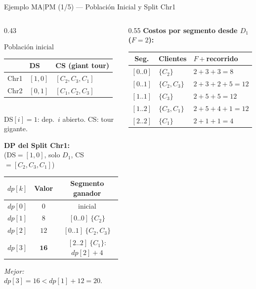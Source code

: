 \documentclass[aspectratio=169,10pt]{beamer}
\begin{document}
\begin{frame}{Ejemplo MA$|$PM (1/5) --- Población Inicial y Split Chr1}
  \begin{columns}[T,onlytextwidth]
    \begin{column}{0.43\textwidth}
      \begin{block}{Población inicial}\footnotesize
        \begin{tabular}{lll}
          \toprule
          & DS & CS (giant tour) \\
          \midrule
          Chr1 & $[1,0]$ & $[C_2,C_3,C_1]$ \\
          Chr2 & $[0,1]$ & $[C_1,C_2,C_3]$ \\
          \bottomrule
        \end{tabular}\\[0.25em]
        DS$[i]{=}1$: dep.\ $i$ abierto. CS: tour gigante.
      \end{block}

      \vspace{0.2em}
      \textbf{DP del Split Chr1:}\\[0.05em]
      \footnotesize (DS$=[1,0]$, solo $D_1$, CS$=[C_2,C_3,C_1]$)
      \vspace{0.15em}
      \begin{center}\footnotesize
      \begin{tabular}{ccc}
        \toprule
        $dp[k]$ & Valor & Segmento ganador \\
        \midrule
        $dp[0]$ & $0$  & inicial \\
        $dp[1]$ & $8$  & $[0..0]\ \{C_2\}$ \\
        $dp[2]$ & $12$ & $[0..1]\ \{C_2,C_3\}$ \\
        $dp[3]$ & $\mathbf{16}$ & $[2..2]\ \{C_1\}$: $dp[2]{+}4$ \\
        \bottomrule
      \end{tabular}
      \end{center}
      \footnotesize \textit{Mejor:} $dp[3]{=}16 < dp[1]{+}12{=}20$.
    \end{column}
    \begin{column}{0.55\textwidth}
      \textbf{Costos por segmento desde $D_1$ ($F{=}2$):}
      \vspace{0.1em}
      \begin{center}\footnotesize
      \begin{tabular}{cll}
        \toprule
        Seg. & Clientes & $F+$recorrido \\
        \midrule
        $[0..0]$ & $\{C_2\}$     & $2{+}3{+}3=8$ \\
        $[0..1]$ & $\{C_2,C_3\}$ & $2{+}3{+}2{+}5=12$ \\
        $[1..1]$ & $\{C_3\}$     & $2{+}5{+}5=12$ \\
        $[1..2]$ & $\{C_3,C_1\}$ & $2{+}5{+}4{+}1=12$ \\
        $[2..2]$ & $\{C_1\}$     & $2{+}1{+}1=4$ \\
        \bottomrule
      \end{tabular}
      \end{center}


\end{column}
\end{columns}
\end{frame}
\end{document}
